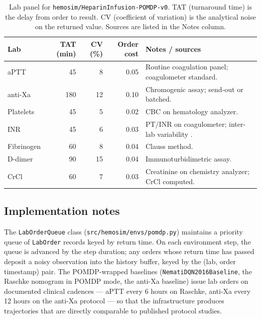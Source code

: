 \documentclass[11pt]{article}
\begin{document}
\begin{table}[ht]
\centering
\caption{Lab panel for \texttt{hemosim/HeparinInfusion-POMDP-v0}. TAT (turnaround time) is the delay from order to result. CV (coefficient of variation) is the analytical noise on the returned value. Sources are listed in the Notes column.}
\label{tab:lab_panel}
\begin{tabular}{@{}lrrrp{5.5cm}@{}}
\toprule
\textbf{Lab} & \textbf{TAT (min)} & \textbf{CV (\%)} & \textbf{Order cost} & \textbf{Notes / sources} \\
\midrule
aPTT        & 45  & 8  & 0.05 & Routine coagulation panel; coagulometer standard. \citep{bowen2016,lippi2012} \\
anti-Xa     & 180 & 12 & 0.10 & Chromogenic assay; send-out or batched. \citep{lippi2012} \\
Platelets   & 45  & 5  & 0.02 & CBC on hematology analyzer. \citep{bowen2016} \\
INR         & 45  & 6  & 0.03 & PT/INR on coagulometer; inter-lab variability \citep{vandenbesselaar2010}. \\
Fibrinogen  & 60  & 8  & 0.04 & Clauss method. \citep{lippi2012} \\
D-dimer     & 90  & 15 & 0.04 & Immunoturbidimetric assay. \citep{whitehead2020} \\
CrCl        & 60  & 7  & 0.03 & Creatinine on chemistry analyzer; CrCl computed. \citep{bowen2016} \\
\bottomrule
\end{tabular}
\end{table}

\subsection{Implementation notes}

The \texttt{LabOrderQueue} class (\texttt{src/hemosim/envs/pomdp.py}) maintains a priority queue of \texttt{LabOrder} records keyed by return time. On each environment step, the queue is advanced by the step duration; any orders whose return time has passed deposit a noisy observation into the history buffer, keyed by the (lab, order timestamp) pair. The POMDP-wrapped baselines (\texttt{NematiDQN2016Baseline}, the Raschke nomogram in POMDP mode, the anti-Xa baseline) issue lab orders on documented clinical cadences --- aPTT every 6 hours on Raschke, anti-Xa every 12 hours on the anti-Xa protocol --- so that the infrastructure produces trajectories that are directly comparable to published protocol studies.
\end{document}
